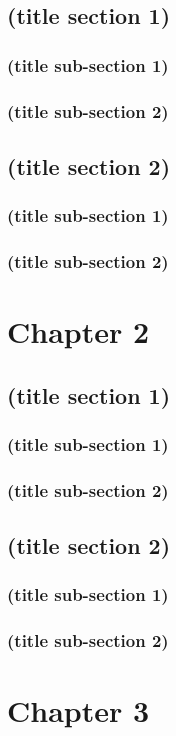 \section{(title section 1)}
\subsection{(title sub-section 1)}
\subsection{(title sub-section 2)}
\section{(title section 2)}
\subsection{(title sub-section 1)}
\subsection{(title sub-section 2)}
\chapter{Chapter 2}
\section{(title section 1)}
\subsection{(title sub-section 1)}
\subsection{(title sub-section 2)}
\section{(title section 2)}
\subsection{(title sub-section 1)}
\subsection{(title sub-section 2)}
\chapter{Chapter 3}
